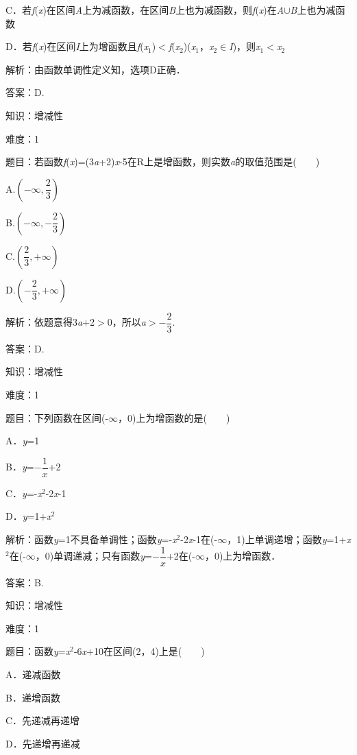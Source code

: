 \documentclass{article} %
\begin{document}
C．若\textit{f}(\textit{x})在区间\textit{A}上为减函数，在区间\textit{B}上也为减函数，则\textit{f}(\textit{x})在\textit{A}$\mathrm{\cup}$\textit{B}上也为减函数

D．若\textit{f}(\textit{x})在区间\textit{I}上为增函数且\textit{f}(\textit{x}${}_{1}$)$\mathrm{<}$\textit{f}(\textit{x}${}_{2}$)(\textit{x}${}_{1}$，\textit{x}${}_{2}$$\mathrm{\in}$\textit{I})，则\textit{x}${}_{1}$$\mathrm{<}$\textit{x}${}_{2}$

解析：由函数单调性定义知，选项D正确．

答案：D.

知识：增减性

难度：1

题目：若函数\textit{f}(\textit{x})=(3\textit{a}+2)\textit{x}-5在R上是增函数，则实数\textit{a}的取值范围是(　　)

A.$(-\infty,\dfrac{2}{3})$  

B.$(-\infty,-\dfrac{2}{3})$ 

C.$(\dfrac{2}{3},+\infty)$  

D.$(-\dfrac{2}{3},+\infty)$ 

解析：依题意得3\textit{a}+2$\mathrm{>}$0，所以\textit{a}$\mathrm{>}$$-\dfrac{2}{3}$.

答案：D.

知识：增减性

难度：1

题目：下列函数在区间(-$\mathrm{\infty}$，0)上为增函数的是(　　)

A．\textit{y}=1   

B．\textit{y}=$-\dfrac{1}{x}$+2

C．\textit{y}=-\textit{x}${}^{2}$-2\textit{x}-1   

D．\textit{y}=1+\textit{x}${}^{2}$

解析：函数\textit{y}=1不具备单调性；函数\textit{y}=-\textit{x}${}^{2}$-2\textit{x}-1在(-$\mathrm{\infty}$，1)上单调递增；函数\textit{y}=1+\textit{x}${}^{2}$在(-$\mathrm{\infty}$，0)单调递减；只有函数\textit{y}=$-\dfrac{1}{x}$+2在(-$\mathrm{\infty}$，0)上为增函数．

答案：B.

知识：增减性

难度：1

题目：函数\textit{y}=\textit{x}${}^{2}$-6\textit{x}+10在区间(2，4)上是(　　)

A．递减函数   

B．递增函数

C．先递减再递增  

D．先递增再递减
\end{document}
